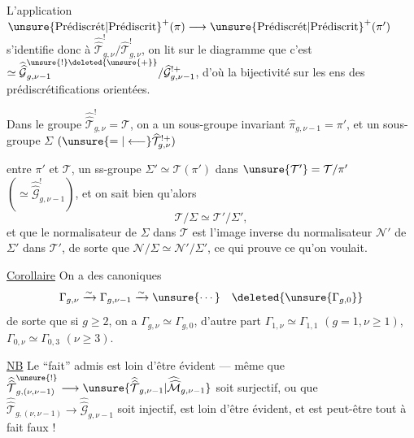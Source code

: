 L'application $\unsure{\text{Prédiscrét}|\text{Prédiscrit}}^{+}(\pi)\longrightarrow
\unsure{\text{Prédiscrét}|\text{Prédiscrit}}^{+}(\pi')$ s'identifie donc à
$\widehat{\widehat{\mathcal T}}_{g,\nu}^{!}/\widehat{\mathcal T}_{g,\nu}^{!}$,
on lit sur le diagramme que c'est
$\simeq\widehat{\widehat{\mathcal G}}_{g,\nu-1}^{\unsure{!}\deleted{\unsure{+}}}/
\widehat{\mathcal G}_{g,\nu-1}^{!+}$,
d'où la bijectivité sur les ens des prédiscrétifications orientées.

Dans le groupe $\widehat{\widehat{\mathcal T}}_{g,\nu}^{!}=\mathcal T$,
on a un sous-groupe invariant $\widehat{\pi}_{g,\nu-1}=\pi'$,
et un sous-groupe $\Sigma$ $(\unsure{=|\longleftarrow}\widehat{\mathcal T}_{g,\nu}^{!+})$


entre $\pi'$ et $\mathcal T$,   un ss-groupe $\Sigma'\simeq\mathcal T(\pi')$ dans $\unsure{\mathcal T'}=\mathcal T/\pi'$ $(\simeq\widehat{\widehat{\mathcal G}}^{!}_{g,\nu-1})$, et on sait bien qu'alors
\[
\mathcal T/\Sigma\simeq\mathcal T'/\Sigma',
\]
et  que le normalisateur  de $\Sigma$ dans $\mathcal T$ est l'image inverse du normalisateur $\mathcal N'$ de $\Sigma'$ dans $\mathcal T'$, de sorte que $\mathcal N/\Sigma\simeq\mathcal N'/\Sigma'$, ce qui prouve ce qu'on voulait.

\uline{Corollaire} On a des  canoniques
\[
\Gamma_{g,\nu}\xrightarrow{\sim}\Gamma_{g,\nu-1}\xrightarrow{\sim}\unsure{\cdots}\quad\deleted{\unsure{\Gamma_{g,0}}}
\]
de sorte que si $g\geq2$, on a  $\Gamma_{g,\nu}\simeq\Gamma_{g,0}$, d'autre part $\Gamma_{1,\nu}\simeq\Gamma_{1,1}$ $(g=1,\nu\geq1)$, $\Gamma_{0,\nu}\simeq\Gamma_{0,3}$ $(\nu\geq3)$.

\uline{NB} Le ``fait''  admis est loin d'être évident --- même que $\widehat{\widehat{\mathcal T}}^{\unsure{!}}_{g,(\nu,\nu-1)}\longrightarrow\unsure{\widehat{\widehat{\mathcal T}}_{g,\nu-1}|\widehat{\widehat{\mathcal M}}_{g,\nu-1}}$ soit surjectif, ou que $\widehat{\widehat{\mathcal T}}_{g,(\nu,\nu-1)}\longrightarrow\widehat{\widehat{\mathcal G}}_{g,\nu-1}$ soit injectif, est loin d'être évident, et est peut-être tout à fait faux !

